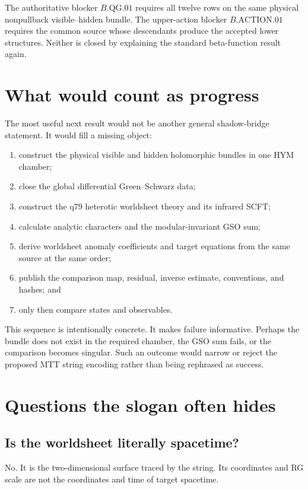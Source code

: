 \documentclass[11pt]{article}
\begin{document}
The authoritative blocker \(B.\mathrm{QG}.01\) requires all twelve rows on
the same physical nonpullback visible--hidden bundle.  The upper-action
blocker \(B.\mathrm{ACTION}.01\) requires the common source whose descendants
produce the accepted lower structures.  Neither is closed by explaining the
standard beta-function result again.

\section{What would count as progress}

The most useful next result would not be another general shadow-bridge
statement.  It would fill a missing object:
\begin{enumerate}
\item construct the physical visible and hidden holomorphic bundles in one
HYM chamber;
\item close the global differential Green--Schwarz data;
\item construct the q79 heterotic worldsheet theory and its infrared SCFT;
\item calculate analytic characters and the modular-invariant GSO sum;
\item derive worldsheet anomaly coefficients and target equations from the
same source at the same order;
\item publish the comparison map, residual, inverse estimate, conventions,
and hashes; and
\item only then compare states and observables.
\end{enumerate}

This sequence is intentionally concrete.  It makes failure informative.
Perhaps the bundle does not exist in the required chamber, the GSO sum fails,
or the comparison becomes singular.  Such an outcome would narrow or reject
the proposed MTT string encoding rather than being rephrased as success.

\section{Questions the slogan often hides}

\subsection{Is the worldsheet literally spacetime?}

No.  It is the two-dimensional surface traced by the string.  Its coordinates
and RG scale are not the coordinates and time of target spacetime.
\end{document}
